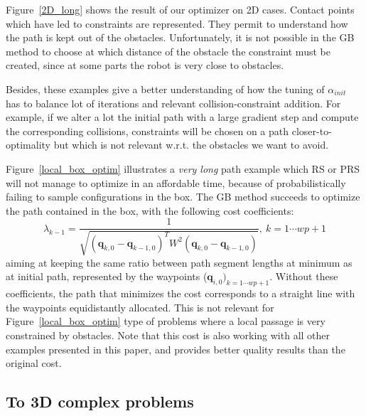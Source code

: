 \documentclass{tADR2e}
\newcommand\conf{\mathbf{q}}
\newcommand\weight{W}
\begin{document}
Figure~\ref{2D_long} shows the result of our optimizer on 2D cases. Contact points which have 
led to constraints are represented. They permit to understand how the path is kept out of the obstacles. 
Unfortunately, it is not possible in the GB method to choose at which distance of the obstacle 
the constraint must be created, since at some parts the robot is very close to obstacles.

Besides, these examples give a better understanding of how the tuning of 
$\alpha_{init}$ 
has to balance lot of iterations and relevant collision-constraint addition. For 
example, if we alter a lot the initial path with a large gradient step and 
compute the corresponding collisions, constraints will be chosen on a 
path closer-to-optimality but which is not relevant
w.r.t. the obstacles we want to avoid.

Figure~\ref{local_box_optim} illustrates a \textit{very long} path example which RS 
or PRS will not manage to 
optimize in an affordable time, because of probabilistically failing to sample 
configurations in the box. The GB method succeeds to optimize the 
path contained in the box, with the following cost coefficients:
$$
\lambda_{k-1} = \frac{1}{\sqrt{(\conf_{k,0}-\conf_{k-1,0})^T \weight^2 
(\conf_{k,0}-\conf_{k-1,0})}}, \  k=1\cdots wp+1  
$$
aiming at keeping the same ratio between path segment lengths at 
minimum as at 
initial path, represented by the waypoints ($\conf_{i,0})_{k=1\cdots wp+1}$.
Without these coefficients, the path that minimizes the cost corresponds to a 
straight line with the waypoints equidistantly allocated. This is not relevant for 
Figure~\ref{local_box_optim} type of problems where a local passage is very
constrained by obstacles. Note that this cost is also working with all other 
examples presented in this paper, and provides better quality results than the original cost.



\subsection{To 3D complex problems}
\end{document}
